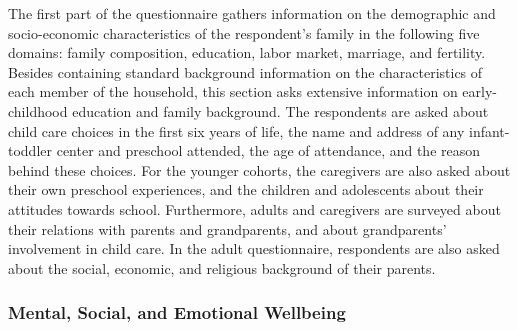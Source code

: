 The first part of the questionnaire gathers information on the demographic
and socio-economic characteristics of the respondent's family in the
following five domains: family composition, education, labor market,
marriage, and fertility. Besides containing standard background information
on the characteristics of each member of the household, this section asks
extensive information on early-childhood education and family background.
The respondents are asked about child care choices in the first six years of
life, the name and address of any infant-toddler center and preschool
attended, the age of attendance, and the reason behind these choices. For the younger cohorts, the caregivers are
also asked about their own preschool experiences, and the children and
adolescents about their attitudes towards school. Furthermore, adults and
caregivers are surveyed about their relations with parents and grandparents,
and about grandparents' involvement in child care. In the adult questionnaire, respondents are also asked about the social,
economic, and religious background of their parents. 

\subsubsection{Mental, Social, and Emotional Wellbeing}

